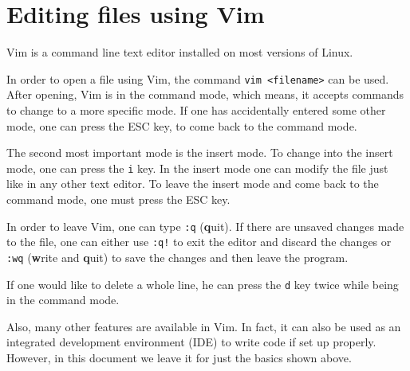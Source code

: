 \section{Editing files using Vim}

Vim is a command line text editor installed on most versions of Linux.

In order to open a file using Vim, the command \lstinline{vim <filename>} can be used. After opening, Vim is in the command mode, which means, it accepts commands to change to a more specific mode. If one has accidentally entered some other mode, one can press the ESC key, to come back to the command mode.

The second most important mode is the insert mode. To change into the insert mode, one can press the \lstinline{i} key. In the insert mode one can modify the file just like in any other text editor. To leave the insert mode and come back to the command mode, one must press the ESC key.

In order to leave Vim, one can type \lstinline{:q} (\textbf{q}uit). If there are unsaved changes made to the file, one can either use \lstinline{:q!} to exit the editor and discard the changes or \lstinline{:wq} (\textbf{w}rite and \textbf{q}uit) to save the changes and then leave the program.

If one would like to delete a whole line, he can press the \lstinline{d} key twice while being in the command mode.

Also, many other features are available in Vim. In fact, it can also be used as an integrated development environment (IDE) to write code if set up properly. However, in this document we leave it for just the basics shown above.
